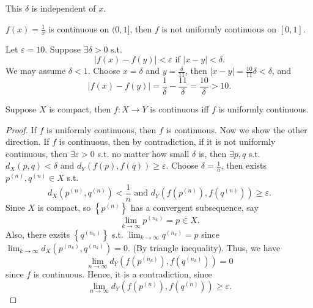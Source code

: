 \begin{remark}
    This \(\delta \) is independent of \(x\). 
\end{remark}

\begin{eg}
    \(f(x)= \frac{1}{x}\) is continuous on \((0, 1]\), then \(f\) is not uniformly continuous on \([0, 1]\).    
\end{eg}
\begin{explanation}
    Let \(\varepsilon = 10\). Suppose \(\exists \delta > 0\) s.t. 
    \[
        \left\vert f(x) - f(y) \right\vert < \varepsilon \text{ if } \vert x - y \vert < \delta. 
    \]  
    We may assume \(\delta < 1\). Choose \(x = \delta \) and \(y = \frac{\delta}{11}\), then \(\vert x - y \vert = \frac{10}{11} \delta < \delta  \), and 
    \[
        \vert f(x) - f(y)  \vert = \frac{1}{\delta } - \frac{11}{\delta } = \frac{10}{\delta } > 10.
    \]    
\end{explanation}

\begin{theorem}
    Suppose \(X\) is compact, then \(f:X \to Y\) is continuous iff \(f\) is uniformly continuous.   
\end{theorem}
\begin{proof}
    If \(f\) is uniformly continuous, then \(f\) is continuous. Now we show the other direction. If \(f\) is continuous, then by contradiction, if it is not uniformly continuous, then \(\exists \varepsilon > 0\) s.t. no matter how small \(\delta \) is, then \(\exists p, q\) s.t. \(d_X(p, q) < \delta \) and \(d_Y(f(p), f(q)) \ge \varepsilon \). Choose \(\delta = \frac{1}{n}\), then exists \(p^{(n)}, q^{(n)} \in X\) s.t. 
    \[
        d_X \left( p^{(n)}, q^{(n)} \right) < \frac{1}{n} \text{ and } d_Y \left( f \left( p^{(n)}\right), f \left( q^{(n)}  \right)   \right) \ge \varepsilon.  
    \]  Since \(X\) is compact, so \(\left\{ p^{(n)} \right\} \) has a convergent subsequence, say 
    \[
        \lim_{k \to \infty} p^{(n_k)} = p \in X.  
    \] Also, there exsits \(\left\{ q^{(n_k)} \right\} \) s.t. \(\lim_{k \to \infty} q^{(n_k)} = p \) since \(\lim_{k \to \infty} d_X \left( p^{(n_k)}, q^{(n_k)} \right) = 0  \). (By triangle inequality). Thus, we have 
    \[
        \lim_{n \to \infty} d_Y \left( f \left( p^{(n_k)} \right) , f \left( q^{(n_k)} \right)  \right) = 0 
    \] since \(f\) is continuous. 
    Hence, it is a contradiction, since
    \[
        \lim_{n \to \infty} d_Y \left( f \left( p^{(n)} \right), f \left( q^{(n)} \right)   \right) \ge \varepsilon. 
    \]
\end{proof}

